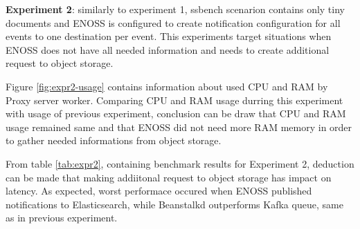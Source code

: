     \textbf{Experiment 2}: similarly to experiment 1, ssbench scenarion contains only tiny documents and ENOSS is configured to create notification configuration for all events to one destination per event. This experiments target situations when ENOSS does not have all needed information and needs to create additional request to object storage.

    Figure \ref{fig:expr2-usage} contains information about used CPU and RAM by Proxy server worker. Comparing CPU and RAM usage durring this experiment with usage of previous experiment, conclusion can be draw that CPU and RAM usage remained same and that ENOSS did not need more RAM memory in order to gather needed informations from object storage.

    From table \ref{tab:expr2}, containing benchmark results for Experiment 2, deduction can be made that making addiitonal request to object storage has impact on latency. As expected, worst performace occured when ENOSS published notifications to Elasticsearch, while Beanstalkd outperforms Kafka queue, same as in previous experiment.

